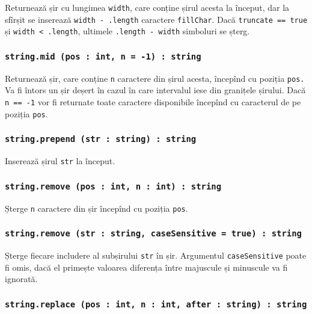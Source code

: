 Returnează șir cu lungimea \texttt{width}, care conține șirul acesta la început, dar la sfîrșit se inserează \texttt{width - .length} caractere \texttt{fillChar}. Dacă \texttt{truncate == true} și \texttt{width < .length}, ultimele \texttt{.length - width} simboluri se șterg.

\subsubsection{\texttt{string.mid (pos : int, n = -1) : string}}

Returnează șir, care conține \texttt{n} caractere din șirul acesta, începînd cu poziția \texttt{pos.} Va fi întors un șir deșert în cazul în care intervalul iese din granițele șirului. Dacă \texttt{n == -1} vor fi returnate toate caractere disponibile începînd cu caracterul de pe poziția \texttt{pos}.

\subsubsection{\texttt{string.prepend (str : string) : string}}

Inserează șirul \texttt{str} la început.

\subsubsection{\texttt{string.remove (pos : int, n : int) : string}}

Șterge \texttt{n} caractere din șir începînd cu poziția \texttt{pos}.

\subsubsection{\texttt{string.remove (str : string, caseSensitive = true) : string}}

Șterge fiecare includere al subșirului \texttt{str} în șir. Argumentul \texttt{caseSensitive} poate fi omis, dacă el primește valoarea \false{} diferența între majuscule și minuscule va fi ignorată.

\subsubsection{\texttt{string.replace (pos : int, n : int, after : string) : string}}

